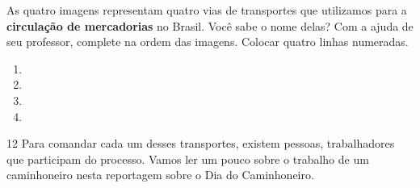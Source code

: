 



As quatro imagens representam quatro vias de transportes que utilizamos
para a \textbf{circulação de mercadorias} no Brasil. Você sabe o nome
delas? Com a ajuda de seu professor, complete na ordem das imagens.
Colocar quatro linhas numeradas.

\begin{enumerate}
\item {}

\item {}

\item {}

\item {}

\end{enumerate}

\num{12} Para comandar cada um desses transportes, existem pessoas, trabalhadores que participam do processo. Vamos ler um
pouco sobre o trabalho de um caminhoneiro nesta reportagem sobre o Dia
do Caminhoneiro.

